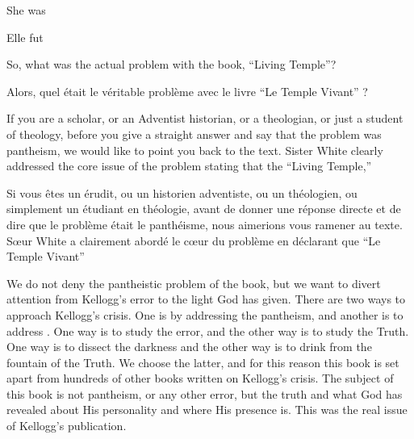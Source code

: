 She was 


Elle fut 


So, what was the actual problem with the book, “Living Temple”?


Alors, quel était le véritable problème avec le livre “Le Temple Vivant” ?


If you are a scholar, or an Adventist historian, or a theologian, or just a student of theology, before you give a straight answer and say that the problem was pantheism, we would like to point you back to the text. Sister White clearly addressed the core issue of the problem stating that the “Living Temple,” 


Si vous êtes un érudit, ou un historien adventiste, ou un théologien, ou simplement un étudiant en théologie, avant de donner une réponse directe et de dire que le problème était le panthéisme, nous aimerions vous ramener au texte. Sœur White a clairement abordé le cœur du problème en déclarant que “Le Temple Vivant” 


We do not deny the pantheistic problem of the book, but we want to divert attention from Kellogg’s error to the light God has given. There are two ways to approach Kellogg’s crisis. One is by addressing the pantheism, and another is to address . One way is to study the error, and the other way is to study the Truth. One way is to dissect the darkness and the other way is to drink from the fountain of the Truth. We choose the latter, and for this reason this book is set apart from hundreds of other books written on Kellogg’s crisis. The subject of this book is not pantheism, or any other error, but the truth and what God has revealed about His personality and where His presence is. This was the real issue of Kellogg’s publication.


